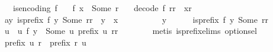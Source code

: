 \begin{isabellebody}
\ \ \ {\isachardoublequoteopen}is{\isacharunderscore}{\kern0pt}encoding\ f{\isachardoublequoteclose}\isanewline
\ \ \ {\isachardoublequoteopen}f\ x\ {\isacharequal}{\kern0pt}\ Some\ r{\isachardoublequoteclose}\isanewline
\ \ \ {\isachardoublequoteopen}decode\ f\ {\isacharparenleft}{\kern0pt}r{\isacharat}{\kern0pt}r{}{\isacharparenright}{\kern0pt}\ {\isacharequal}{\kern0pt}\ {\isacharparenleft}{\kern0pt}x{\isacharcomma}{\kern0pt}r{}{\isacharparenright}{\kern0pt}{\isachardoublequoteclose}\isanewline
%
\isadelimproof
%
\endisadelimproof
%
\isatagproof
{}\isamarkupfalse%
\ {\isacharminus}{\kern0pt}\isanewline
\ \ \isamarkupfalse%
\ a{\isacharcolon}{\kern0pt}{\isachardoublequoteopen}{\isasymAnd}y{\isachardot}{\kern0pt}\ is{\isacharunderscore}{\kern0pt}prefix\ {\isacharparenleft}{\kern0pt}f\ y{\isacharparenright}{\kern0pt}\ {\isacharparenleft}{\kern0pt}Some\ {\isacharparenleft}{\kern0pt}r{\isacharat}{\kern0pt}r{}{\isacharparenright}{\kern0pt}{\isacharparenright}{\kern0pt}\ {\isasymLongrightarrow}\ y\ {\isacharequal}{\kern0pt}\ x{\isachardoublequoteclose}\isanewline
\ \ \isamarkupfalse%
\ {\isacharminus}{\kern0pt}\isanewline
\ \ \ \ \isamarkupfalse%
\ y\isanewline
\ \ \ \ \isamarkupfalse%
\ {\isachardoublequoteopen}is{\isacharunderscore}{\kern0pt}prefix\ {\isacharparenleft}{\kern0pt}f\ y{\isacharparenright}{\kern0pt}\ {\isacharparenleft}{\kern0pt}Some\ {\isacharparenleft}{\kern0pt}r{\isacharat}{\kern0pt}r{}{\isacharparenright}{\kern0pt}{\isacharparenright}{\kern0pt}{\isachardoublequoteclose}\isanewline
\ \ \ \ \isamarkupfalse%
\ \isamarkupfalse%
\ u\ \ u{\isacharunderscore}{\kern0pt}{}{\isacharcolon}{\kern0pt}\ {\isachardoublequoteopen}f\ y\ {\isacharequal}{\kern0pt}\ Some\ u{\isachardoublequoteclose}\ {\isachardoublequoteopen}prefix\ u\ {\isacharparenleft}{\kern0pt}r{\isacharat}{\kern0pt}r{}{\isacharparenright}{\kern0pt}{\isachardoublequoteclose}\isanewline
\ \ \ \ \ \ \isamarkupfalse%
\ {\isacharparenleft}{\kern0pt}metis\ is{\isacharunderscore}{\kern0pt}prefix{\isachardot}{\kern0pt}elims{\isacharparenleft}{\kern0pt}{}{\isacharparenright}{\kern0pt}\ option{\isachardot}{\kern0pt}sel{\isacharparenright}{\kern0pt}\isanewline
\ \ \ \ \isamarkupfalse%
\ {\isachardoublequoteopen}prefix\ u\ r\ {\isasymor}\ prefix\ r\ u{\isachardoublequoteclose}\ \isanewline

\end{isabellebody}

